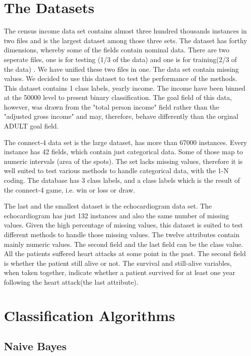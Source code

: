 \documentclass[a4paper]{article}
\begin{document}
\section{The Datasets}
The census income data set contains almost three hundred thousands instances in two files and is the largest dataset among those three sets. The dataset has forthy dimensions, whereby some of the fields contain nominal data. There are two seperate files, one is for testing (1/3 of the data) and one is for training(2/3 of the data) . We have unified these two files in one. The data set contain missing values. We decided to use this dataset to test the performance of the methods. This dataset contains 1 class labels, yearly income. The income have been binned at the 50000 level to present binary classification. The goal field of this data, however, was drawn from the "total person income" field rather than the "adjusted gross income" and may, therefore, behave differently than the orginal ADULT goal field.

The connect-4 data set is the large dataset, has more than 67000 instances. Every instance has 42 fields,
which contain just categorical data. Some of those map to numeric intervals
(area of the spots). The set lacks missing values, therefore it is well suited
to test various methods to handle categorical data, with the 1-N coding. The database has 3 class labels, and a class labels which
is the result of the connect-4 game, i.e. win or loss or draw.

The last and the smallest dataset is the echocardiogram data set. The
echocardiogram has just 132 instances and also the same number of missing values. Given the high percentage of
missing values, this dataset is suited to test different methods to handle those missing values. The twelve attributes contain mainly numeric values. The second field and the last field can be the class value. All the patients suffered heart attacks at some point in the past. The second field is whether the patient still alive or not. The survival and still-alive variables, when taken together, indicate whether a patient survived for at least one year following the heart attack(the last attribute). 

\section{Classification Algorithms}

    \subsection{ Naive Bayes}
\end{document}
